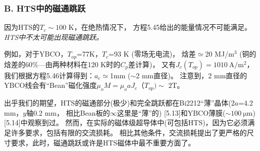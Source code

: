 \subsubsection*{B. HTS中的磁通跳跃}

因为HTS的$T_c\sim 100$ K，在绝热情况下，
方程5.45给出的能量情况不可能满足。\textit{HTS中不太可能出现磁通跳跃。}

例如，对于YBCO，$T_{op}$=77K，$T_c$=93 K (零场无电流)，
焓差$\simeq$20 MJ/$\mathrm{m^3}$
(铜的焓差的60\%---由两种材料在120 K时的$C_p$差计算)，
又有$J_c(T_{op})=1010\ \mathrm{A/m^2}$，
我们根据方程5.46计算得到：$a_c\simeq$1mm ($\sim$2 mm直径)。
注意到，2 mm直径的YBCO线会有“Bean”磁化强度$\mu_o M=\mu_o a J_c（T_{op})\sim$ 2T。

出乎我们的期望，HTS的磁通部分(极少)和完全跳跃都在Bi2212“薄”晶体($2a$=4.2 mm，$y$轴0.2 mm，
相比Bean板的$\infty$这里是“薄”的)
[5.13]和YBCO薄膜($\sim 100\ \mathrm{\mu}$m)[5.14]中观察到过。
然而，在实际的磁体级超导体中(可包括HTS)，因为它必须满足许多要求，包括有限的交流损耗。
相比其他条件，交流损耗提出了更严格的尺寸要求，此时，磁通跳跃或许是HTS磁体中最不重要方面了。